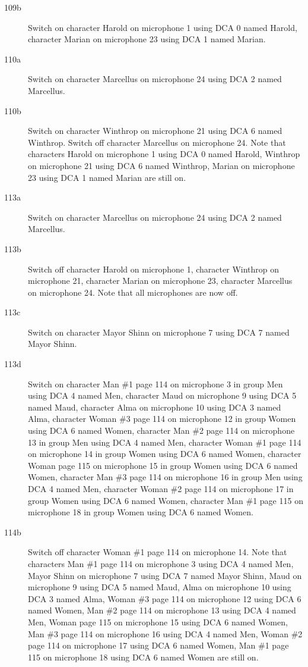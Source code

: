 \begin{description}
\item[109b]
Switch on character Harold on microphone 1 using DCA 0 named Harold, character Marian on microphone 23 using DCA 1 named Marian. 

\item[110a]
Switch on character Marcellus on microphone 24 using DCA 2 named Marcellus. 

\item[110b]
Switch on character Winthrop on microphone 21 using DCA 6 named Winthrop. Switch off character Marcellus on microphone 24. Note that characters Harold on microphone 1 using DCA 0 named Harold, Winthrop on microphone 21 using DCA 6 named Winthrop, Marian on microphone 23 using DCA 1 named Marian are still on.  

\item[113a]
Switch on character Marcellus on microphone 24 using DCA 2 named Marcellus. 

\item[113b]
Switch off character Harold on microphone 1, character Winthrop on microphone 21, character Marian on microphone 23, character Marcellus on microphone 24. Note that all microphones are now off.

\item[113c]
Switch on character Mayor Shinn on microphone 7 using DCA 7 named Mayor Shinn. 

\item[113d]
Switch on character Man \#1 page 114 on microphone 3 in group Men using DCA 4 named Men, character Maud on microphone 9 using DCA 5 named Maud, character Alma on microphone 10 using DCA 3 named Alma, character Woman \#3 page 114 on microphone 12 in group Women using DCA 6 named Women, character Man \#2 page 114 on microphone 13 in group Men using DCA 4 named Men, character Woman \#1 page 114 on microphone 14 in group Women using DCA 6 named Women, character Woman page 115 on microphone 15 in group Women using DCA 6 named Women, character Man \#3 page 114 on microphone 16 in group Men using DCA 4 named Men, character Woman \#2 page 114 on microphone 17 in group Women using DCA 6 named Women, character Man \#1 page 115 on microphone 18 in group Women using DCA 6 named Women. 

\item[114b]
Switch off character Woman \#1 page 114 on microphone 14. Note that characters Man \#1 page 114 on microphone 3 using DCA 4 named Men, Mayor Shinn on microphone 7 using DCA 7 named Mayor Shinn, Maud on microphone 9 using DCA 5 named Maud, Alma on microphone 10 using DCA 3 named Alma, Woman \#3 page 114 on microphone 12 using DCA 6 named Women, Man \#2 page 114 on microphone 13 using DCA 4 named Men, Woman page 115 on microphone 15 using DCA 6 named Women, Man \#3 page 114 on microphone 16 using DCA 4 named Men, Woman \#2 page 114 on microphone 17 using DCA 6 named Women, Man \#1 page 115 on microphone 18 using DCA 6 named Women are still on.  


\end{description}

